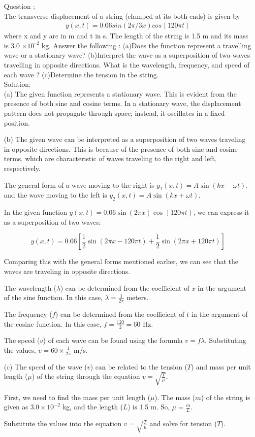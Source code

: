 \documentclass{article}
\begin{document}
Question ;\\
The transverse displacement of a string (clamped at its both ends) is given by
\begin{align}
y(x, t) = 0.06 sin ({2\pi/3}x) cos (120 \pi t)
\end{align}
where x and y are in m and t in s. The length of the string is 1.5 m and its mass is
3.0 $\times 10^{–2}$ kg.
Answer the following :
(a)Does the function represent a travelling wave or a stationary wave?
(b)Interpret the wave as a superposition of two waves travelling in opposite
directions. What is the wavelength, frequency, and speed of each wave ?
(c)Determine the tension in the string.\\

Solution:\\

(a) The given function represents a stationary wave. This is evident from the presence of both sine and cosine terms. In a stationary wave, the displacement pattern does not propagate through space; instead, it oscillates in a fixed position.

(b) The given wave can be interpreted as a superposition of two waves traveling in opposite directions. This is because of the presence of both sine and cosine terms, which are characteristic of waves traveling to the right and left, respectively.

The general form of a wave moving to the right is \( y_1(x, t) = A \sin(kx - \omega t) \), and the wave moving to the left is \( y_2(x, t) = A \sin(kx + \omega t) \).

In the given function \( y(x, t) = 0.06 \sin(2\pi x) \cos(120\pi t) \), we can express it as a superposition of two waves:

\[
y(x, t) = 0.06 \left[ \frac{1}{2}\sin(2\pi x - 120\pi t) + \frac{1}{2}\sin(2\pi x + 120\pi t) \right]
\]

Comparing this with the general forms mentioned earlier, we can see that the waves are traveling in opposite directions.

The wavelength (\( \lambda \)) can be determined from the coefficient of \( x \) in the argument of the sine function. In this case, \( \lambda = \frac{1}{2\pi} \) meters.

The frequency (\( f \)) can be determined from the coefficient of \( t \) in the argument of the cosine function. In this case, \( f = \frac{120}{2} = 60 \) Hz.

The speed (\( v \)) of each wave can be found using the formula \( v = f \lambda \). Substituting the values, \( v = 60 \times \frac{1}{2\pi} \) m/s.

(c) The speed of the wave (\( v \)) can be related to the tension (\( T \)) and mass per unit length (\( \mu \)) of the string through the equation \( v = \sqrt{\frac{T}{\mu}} \).

First, we need to find the mass per unit length (\( \mu \)). The mass (\( m \)) of the string is given as \( 3.0 \times 10^{-2} \) kg, and the length (\( L \)) is 1.5 m. So, \( \mu = \frac{m}{L} \).

Substitute the values into the equation \( v = \sqrt{\frac{T}{\mu}} \) and solve for tension (\( T \)).
\end{document}
